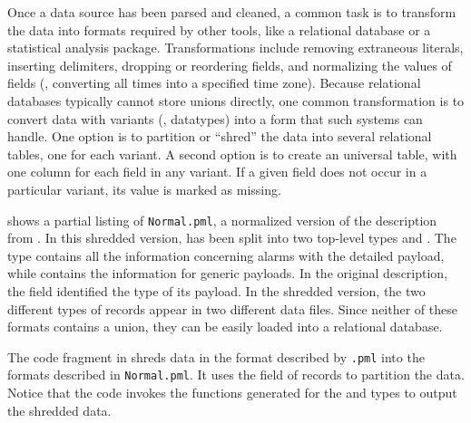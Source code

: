 \documentclass{sigplanconf}
\begin{document}
Once a data source has been parsed and cleaned, a common task is to
transform the data into formats required by other tools, like a
relational database or a statistical analysis package.
Transformations include removing extraneous literals, inserting
delimiters, dropping or reordering fields, and normalizing the values
of fields (\eg{}, converting all times into a specified time zone).
Because relational databases typically cannot store unions directly,
one common transformation is to convert data with variants (\ie{},
datatypes) into a form that such systems can handle.  One option is to
partition or ``shred'' the data into several relational tables, one
for each variant.  A second option is to create an universal table,
with one column for each field in any variant.  If a given field does
not occur in a particular variant, its value is marked as missing.

 shows a partial listing of
\texttt{\darkstar{}Normal.pml}, a normalized version of the
\darkstar{} description from . In this
shredded version,  has been split into two top-level types
 and .  The type  contains all
the information concerning alarms with the detailed payload, while
 contains the information for generic payloads.  In the
original description, the  field identified the type of its
payload.  In the shredded version, the two different types of records
appear in two different data files. Since neither of these formats
contains a union, they can be easily loaded into a relational
database.

The code fragment in  shreds \darkstar{}
data in the format described by \texttt{\darkstar{}.pml} into the
formats described in \texttt{\darkstar{}Normal.pml}.  It uses the
 field of  records to partition the data. 
Notice that the code invokes the  functions generated for the  and  types to output the shredded data.

\end{document}
